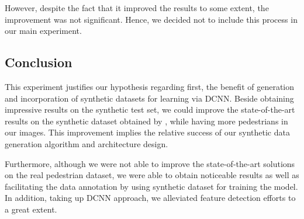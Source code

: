 However, despite the fact that it improved the results to some extent, the improvement was not significant. Hence, we decided not to include this process in our main experiment. 
%
%
%

\subsection{Conclusion}

This experiment justifies our hypothesis regarding first, the benefit of generation and incorporation of synthetic datasets for learning via DCNN. Beside obtaining impressive results on the synthetic test set, we could improve the state-of-the-art results on the synthetic dataset obtained by \citet{segui2015learning}, while having more pedestrians in our images. This improvement implies the relative success of our synthetic data generation algorithm and architecture design.

Furthermore, although we were not able to improve the state-of-the-art solutions on the real pedestrian dataset, we were able to obtain noticeable results as well as facilitating the data annotation by using synthetic dataset for training the model. In addition, taking up DCNN approach, we alleviated feature detection efforts to a great extent. 
